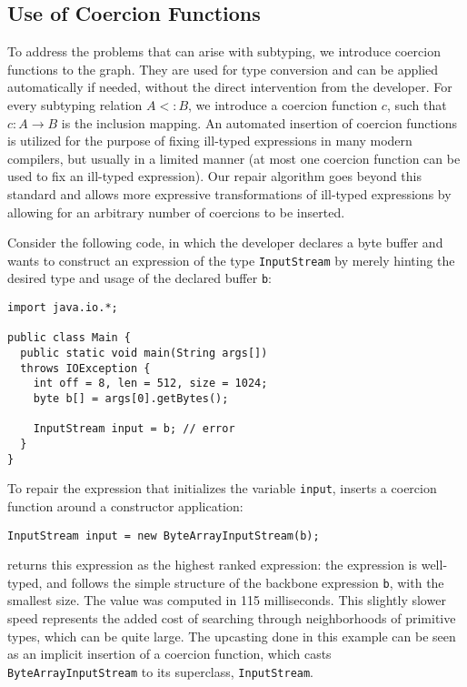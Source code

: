 %

\subsection{Use of Coercion Functions}

To address the problems that can arise with subtyping, we introduce coercion functions \cite{TannenCoercionS91} to the graph. They are used for type conversion and can be applied automatically if needed, without the direct intervention from the developer. For every subtyping relation $A<:B$, we introduce a coercion function $c$, such that $c: A \rightarrow B$ is the inclusion mapping. An automated insertion of coercion functions is utilized for the purpose of fixing ill-typed expressions in many modern compilers, but usually in a limited manner (at most one coercion function can be used to fix an ill-typed expression). Our repair algorithm goes beyond this standard and allows more expressive transformations of ill-typed expressions by allowing for an arbitrary number of coercions to be inserted.

Consider the following code, in which the developer declares a byte buffer and wants to construct an expression of the type \lstinline{InputStream} by merely hinting the desired type and usage of the declared buffer \lstinline{b}:
\begin{lstlisting}
import java.io.*;

public class Main {
  public static void main(String args[]) 
  throws IOException {
    int off = 8, len = 512, size = 1024;
    byte b[] = args[0].getBytes();
    
    InputStream input = b; // error
  }
}
\end{lstlisting}

To repair the expression that initializes the variable \lstinline{input}, \ourTool inserts a coercion function  around a constructor application:
\begin{lstlisting}    
InputStream input = new ByteArrayInputStream(b);
\end{lstlisting}
\ourTool returns this expression as the highest ranked expression: the expression is well-typed, and follows the simple structure of the backbone expression \lstinline{b}, with the smallest size. The value was computed in 115 milliseconds. This slightly slower speed represents the added cost of searching through neighborhoods of primitive types, which can be quite large. The upcasting done in this example can be seen as an implicit insertion of a coercion function, which casts \lstinline{ByteArrayInputStream} to its superclass, \lstinline{InputStream}.


